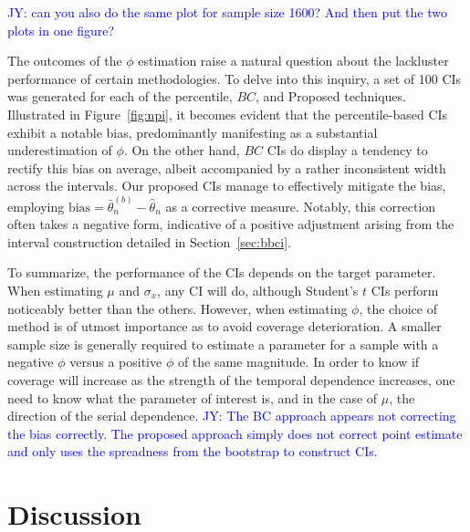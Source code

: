 \documentclass[12pt, letterpaper, titlepage]{article}
\newcommand{\jy}[1]{\textcolor{blue}{JY: #1}}
\begin{document}
\jy{can you also do the same plot for sample size 1600? And then put the two
  plots in one figure?}

The outcomes of the $\phi$ estimation raise a natural question about the
lackluster performance of certain methodologies. To delve into this inquiry, a
set of 100 CIs was generated for each of the percentile,
$BC$, and Proposed techniques. Illustrated in Figure~\ref{fig:npi}, it becomes
evident that the percentile-based CIs exhibit a notable bias, predominantly
manifesting as a substantial underestimation of $\phi$. On the other hand, $BC$
CIs do display a tendency to rectify this bias on average, albeit accompanied by
a rather inconsistent width across the intervals. Our proposed CIs manage to
effectively mitigate the bias, employing $\widehat{\text{bias}} =
\bar\theta_n^{(b)} - \hat\theta_n$ as a corrective measure. Notably, this
correction often takes a negative form, indicative of a positive adjustment
arising from the interval construction detailed in Section~\ref{sec:bbci}.


To summarize, the performance of the CIs depends on the target parameter. When
estimating $\mu$ and $\sigma_x$, any CI will do, although Student's $t$ CIs
perform noticeably better than the others. However, when estimating $\phi$,
the choice of method is of utmost importance as to avoid coverage
deterioration. A smaller sample size is generally required to estimate a
parameter for a sample with a negative $\phi$ versus a positive $\phi$ of the
same magnitude. In order to know if coverage will increase as the strength of
the temporal dependence increases, one need to know what the parameter of
interest is, and in the case of $\mu$, the direction of the serial dependence.
\jy{The BC approach appears not correcting the bias correctly. The proposed
  approach simply does not correct point estimate and only uses the spreadness
  from the bootstrap to construct CIs.}


\section{Discussion}
\label{sec:disc}
\end{document}
